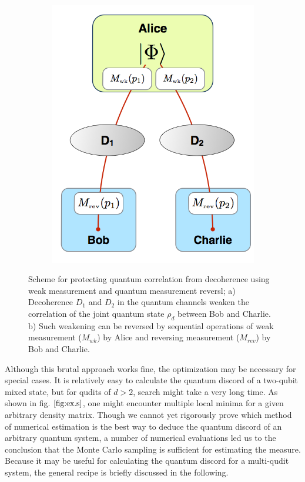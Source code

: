 \documentclass[%
 reprint,
 amsmath,amssymb,
 aps,
]{revtex4-1}
\begin{document}
\begin{figure}
\begin{subfigure}[b]{0.23\textwidth}
                \includegraphics[width=\textwidth]{expw}
                \caption{}
                \label{fig:w}
        \end{subfigure}
        \caption{Scheme for protecting quantum correlation from decoherence using weak measurement and quantum measurement reversl; a) Decoherence $D_1$ and $D_2$ in the quantum channels weaken the correlation of the joint quantum state $\rho_d$ between Bob and Charlie. b) Such weakening can be reversed by sequential operations of weak measurement ($M_{wk}$) by Alice and reversing measurement ($M_{rev}$) by Bob and Charlie.}\label{fig:scheme}
\end{figure}

Although this brutal approach works fine, the optimization may be necessary for special cases. It is relatively easy to calculate the quantum discord of a two-qubit mixed state, but for qudits of $d>2$, search might take a very long time. As shown in fig. $\ref{fig:ex.s}$, one might encounter multiple local minima for a given arbitrary density matrix. Though we cannot yet rigorously prove which method of numerical estimation is the best way to deduce the quantum discord of an arbitrary quantum system, a number of numerical evaluations led us to the conclusion that the Monte Carlo sampling is sufficient for estimating the measure. Because it may be useful for calculating the quantum discord for a multi-qudit system, the general recipe is briefly discussed in the following.
\end{document}

